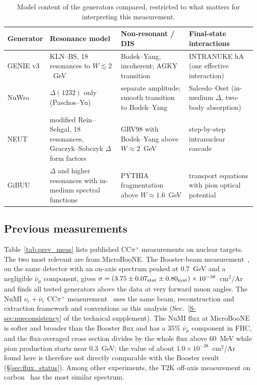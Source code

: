 \documentclass[11pt,a4paper]{article}
\newcommand{\uboone}{MicroBooNE}
\newcommand{\suppref}[2]{#1~\ref{S-#2} of the technical supplement}
\begin{document}
\begin{table}[H]
  \centering
  \caption{Model content of the generators compared, restricted to what matters for
    interpreting this measurement.}
  \label{tab:gen_config}
  \small
  \begin{tabular}{L{2.0cm} L{4.6cm} L{3.4cm} L{4.2cm}}
    \toprule
    Generator & Resonance model & Non-resonant / DIS & Final-state interactions \\
    \midrule
    GENIE v3~\cite{genie,genie3} & KLN--BS, 18 resonances to $W\lesssim2$~GeV & Bodek--Yang, incoherent; AGKY transition & INTRANUKE hA (one effective interaction) \\
    NuWro~\cite{nuwro} & $\Delta(1232)$ only (Paschos--Yu) & separate amplitude; smooth transition to Bodek--Yang & Salcedo--Oset (in-medium $\Delta$, two-body absorption) \\
    NEUT~\cite{neut,neut2021} & modified Rein--Sehgal, 18 resonances, Graczyk--Sobczyk $\Delta$ form factors & GRV98 with Bodek--Yang above $W\approx2$~GeV & step-by-step intranuclear cascade \\
    GiBUU~\cite{gibuu} & $\Delta$ and higher resonances with in-medium spectral functions & PYTHIA fragmentation above $W\approx1.6$~GeV & transport equations with pion optical potential \\
    \bottomrule
  \end{tabular}
\end{table}

\subsection{Previous measurements}
\label{sec:prev_meas}

Table~\ref{tab:prev_meas} lists published CC$\pi^+$ measurements on nuclear targets. The two most
relevant are from \uboone{}. The Booster-beam measurement~\cite{uboone_bnb2026_ccpi}, on the same
detector with an on-axis spectrum peaked at $0.7$~GeV and a negligible $\bar\nu_\mu$ component,
gives $\sigma=(3.75\pm0.07_{\rm stat}\pm0.80_{\rm syst})\times10^{-38}$~cm$^2$/Ar and finds all
tested generators above the data at very forward muon angles. The NuMI $\nu_e+\bar\nu_e$ CC$\pi^+$
measurement~\cite{uboone_nue_ccpi} uses the same beam, reconstruction and extraction framework and
conventions as this analysis (\suppref{Sec.}{sec:nueconsistency}). The NuMI flux at \uboone{} is
softer and broader than the Booster flux and has a $35\%$ $\bar\nu_\mu$ component in FHC, and the
flux-averaged cross section divides by the whole flux above $60$~MeV while pion production starts
near $0.3$~GeV; the value of about $1.0\times10^{-38}$~cm$^2$/Ar found here is therefore not
directly comparable with the Booster result (\S\ref{sec:flux_status}). Among other experiments, the
T2K off-axis measurement on carbon~\cite{t2k_ccpip} has the most similar spectrum.
\end{document}
